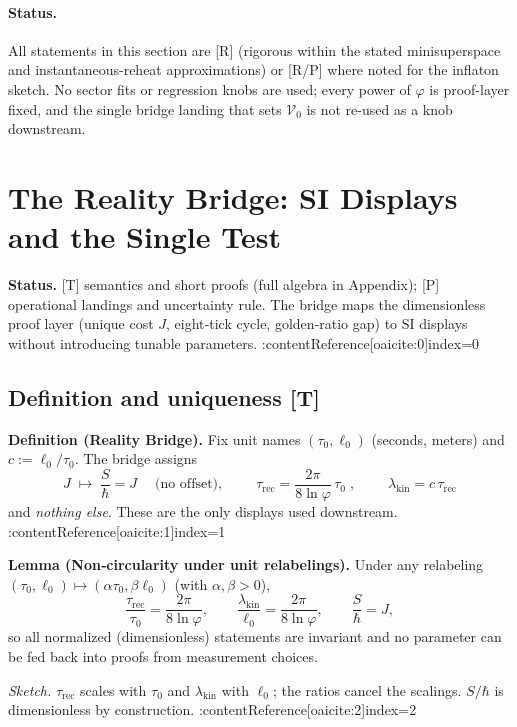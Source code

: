\documentclass[11pt]{article}
\begin{document}
\paragraph{Status.}
All statements in this section are [R] (rigorous within the stated minisuperspace and instantaneous-reheat approximations) or [R/P] where noted for the inflaton sketch. No sector fits or regression knobs are used; every power of $\varphi$ is proof-layer fixed, and the single bridge landing that sets $\mathcal V_{0}$ is not re-used as a knob downstream.

\section{The Reality Bridge: SI Displays and the Single Test}

\noindent\textbf{Status.} [T] semantics and short proofs (full algebra in Appendix); [P] operational landings and uncertainty rule. The bridge maps the dimensionless proof layer (unique cost \(J\), eight‑tick cycle, golden‑ratio gap) to SI displays without introducing tunable parameters. :contentReference[oaicite:0]{index=0}

\subsection*{Definition and uniqueness [T]}
\textbf{Definition (Reality Bridge).}
Fix unit names \((\tau_{0},\ell_{0})\) (seconds, meters) and \(c:=\ell_{0}/\tau_{0}\).
The bridge assigns
\[
\boxed{\;J \;\longmapsto\; \frac{S}{\hbar}=J\;}\quad\text{(no offset)},
\qquad
\boxed{\;\tau_{\mathrm{rec}}=\frac{2\pi}{8\ln\varphi}\,\tau_{0}\;},
\qquad
\boxed{\;\lambda_{\mathrm{kin}}=c\,\tau_{\mathrm{rec}}\;}
\]
and \emph{nothing else}. These are the only displays used downstream. :contentReference[oaicite:1]{index=1}

\medskip
\noindent\textbf{Lemma (Non‑circularity under unit relabelings).}
Under any relabeling \((\tau_{0},\ell_{0})\mapsto(\alpha\tau_{0},\beta\ell_{0})\) (with \(\alpha,\beta>0\)),
\[
\frac{\tau_{\mathrm{rec}}}{\tau_{0}}=\frac{2\pi}{8\ln\varphi},
\qquad
\frac{\lambda_{\mathrm{kin}}}{\ell_{0}}=\frac{2\pi}{8\ln\varphi},
\qquad
\frac{S}{\hbar}=J,
\]
so all normalized (dimensionless) statements are invariant and no parameter can be fed back into proofs from measurement choices.

\emph{Sketch.} \(\tau_{\mathrm{rec}}\) scales with \(\tau_{0}\) and \(\lambda_{\mathrm{kin}}\) with \(\ell_{0}\); the ratios cancel the scalings. \(S/\hbar\) is dimensionless by construction. :contentReference[oaicite:2]{index=2}
\end{document}
